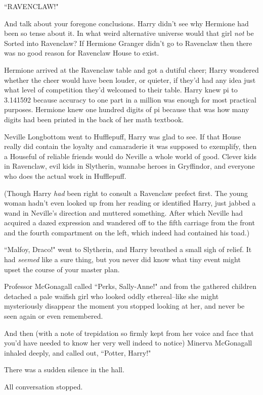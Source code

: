 ``RAVENCLAW!"

And talk about your foregone conclusions. Harry didn't see why Hermione had been so tense about it. In what weird alternative universe would that girl \emph{not} be Sorted into Ravenclaw? If Hermione Granger didn't go to Ravenclaw then there was no good reason for Ravenclaw House to exist.

Hermione arrived at the Ravenclaw table and got a dutiful cheer; Harry wondered whether the cheer would have been louder, or quieter, if they'd had any idea just what level of competition they'd welcomed to their table. Harry knew pi to 3.141592 because accuracy to one part in a million was enough for most practical purposes. Hermione knew one hundred digits of pi because that was how many digits had been printed in the back of her math textbook.

Neville Longbottom went to Hufflepuff, Harry was glad to see. If that House really did contain the loyalty and camaraderie it was supposed to exemplify, then a Houseful of reliable friends would do Neville a whole world of good. Clever kids in Ravenclaw, evil kids in Slytherin, wannabe heroes in Gryffindor, and everyone who does the actual work in Hufflepuff.

(Though Harry \emph{had} been right to consult a Ravenclaw prefect first. The young woman hadn't even looked up from her reading or identified Harry, just jabbed a wand in Neville's direction and muttered something. After which Neville had acquired a dazed expression and wandered off to the fifth carriage from the front and the fourth compartment on the left, which indeed had contained his toad.)

``Malfoy, Draco!" went to Slytherin, and Harry breathed a small sigh of relief. It had \emph{seemed} like a sure thing, but you never did know what tiny event might upset the course of your master plan.

Professor McGonagall called ``Perks, Sally-Anne!" and from the gathered children detached a pale waifish girl who looked oddly ethereal\---like she might mysteriously disappear the moment you stopped looking at her, and never be seen again or even remembered.

And then (with a note of trepidation so firmly kept from her voice and face that you'd have needed to know her very well indeed to notice) Minerva McGonagall inhaled deeply, and called out, ``Potter, Harry!"

There was a sudden silence in the hall.

All conversation stopped.

